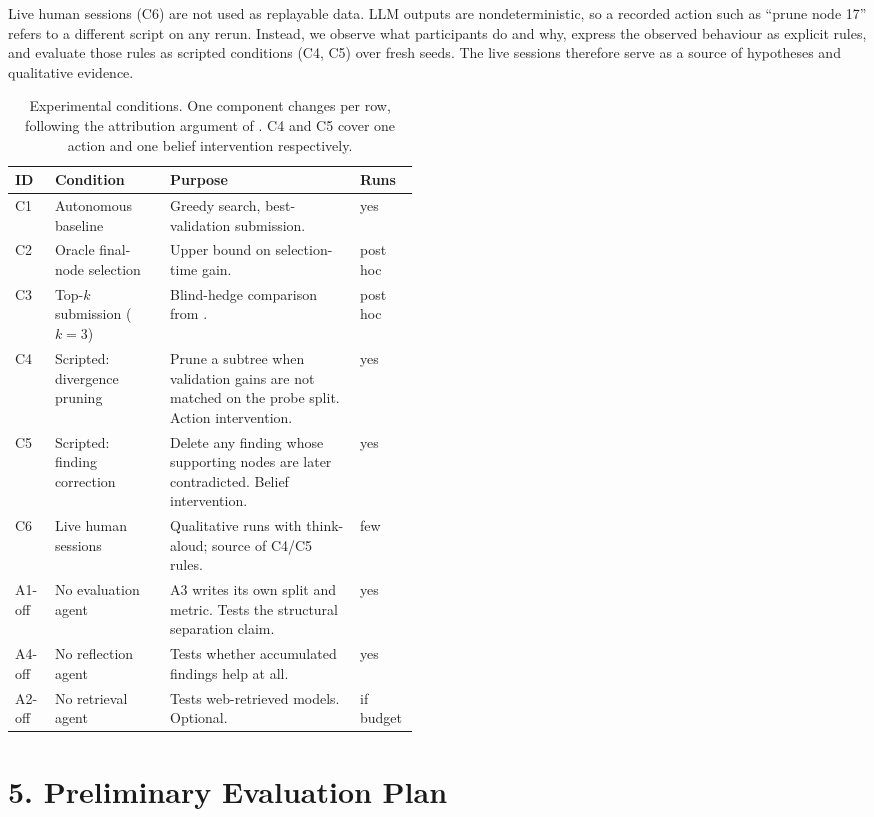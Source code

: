 \documentclass[11pt]{article}
\begin{document}
Live human sessions (C6) are not used as replayable data. LLM outputs are
nondeterministic, so a recorded action such as ``prune node 17'' refers to a
different script on any rerun. Instead, we observe what participants do and why,
express the observed behaviour as explicit rules, and evaluate those rules as
scripted conditions (C4, C5) over fresh seeds. The live sessions therefore serve as a
source of hypotheses and qualitative evidence.

\begin{table}[H]
\centering
\small
\begin{tabular}{@{}llp{0.47\linewidth}l@{}}
\toprule
\textbf{ID} & \textbf{Condition} & \textbf{Purpose} & \textbf{Runs} \\
\midrule
C1 & Autonomous baseline & Greedy search, best-validation submission. & yes \\
C2 & Oracle final-node selection & Upper bound on selection-time gain. & post hoc \\
C3 & Top-$k$ submission ($k=3$) & Blind-hedge comparison from \cite{aira}. & post hoc \\
C4 & Scripted: divergence pruning & Prune a subtree when validation gains are not
      matched on the probe split. Action intervention. & yes \\
C5 & Scripted: finding correction & Delete any finding whose supporting nodes are
      later contradicted. Belief intervention. & yes \\
C6 & Live human sessions & Qualitative runs with think-aloud; source of C4/C5 rules.
      & few \\
\midrule
A1-off & No evaluation agent & A3 writes its own split and metric. Tests the
      structural separation claim. & yes \\
A4-off & No reflection agent & Tests whether accumulated findings help at all. & yes \\
A2-off & No retrieval agent & Tests web-retrieved models. Optional. & if budget \\
\bottomrule
\end{tabular}
\caption{Experimental conditions. One component changes per row, following the
attribution argument of \cite{aira}. C4 and C5 cover one action and one belief
intervention respectively.}
\label{tab:conditions}
\end{table}

\section*{5. Preliminary Evaluation Plan}
\end{document}
